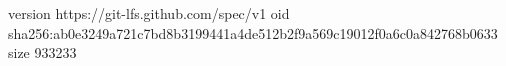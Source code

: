 version https://git-lfs.github.com/spec/v1
oid sha256:ab0e3249a721c7bd8b3199441a4de512b2f9a569c19012f0a6c0a842768b0633
size 933233

